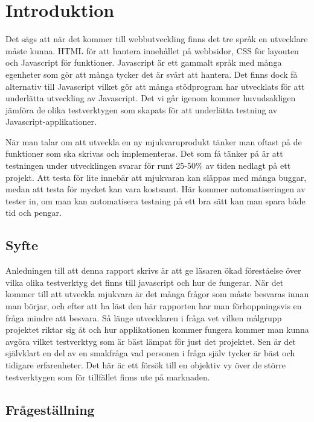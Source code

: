 \section{Introduktion}
\label{sec:david-introduction}
Det sägs att när det kommer till webbutveckling finns det tre språk en utvecklare måste kunna. HTML för att hantera innehållet på webbsidor, CSS för layouten och Javascript för funktioner. Javascript är ett gammalt språk med många egenheter som gör att många tycker det är svårt att hantera. Det finns dock få alternativ till Javascript vilket gör att många stödprogram har utvecklats för att underlätta utveckling av Javascript. Det vi går igenom kommer huvudsakligen jämföra de olika testverktygen som skapats för att underlätta testning av Javascript-applikationer. 


När man talar om att utveckla en ny mjukvaruprodukt tänker man oftast på de funktioner som ska skrivas och implementeras. Det som få tänker på är att testningen under utvecklingen svarar för runt 25-50\% av tiden nedlagt på ett projekt. Att testa för lite innebär att mjukvaran kan släppas med många buggar, medan att testa för mycket kan vara kostsamt. Här kommer automatiseringen av tester in, om man kan automatisera testning på ett bra sätt kan man spara både tid och pengar.

\subsection{Syfte}
Anledningen till att denna rapport skrivs är att ge läsaren ökad föreståelse över vilka olika testverktyg det finns till javascript och hur de fungerar. När det kommer till att utveckla mjukvara är det många frågor som måste besvaras innan man börjar, och efter att ha läst den här rapporten har man förhoppningsvis en fråga mindre att besvara. Så länge utvecklaren i fråga vet vilken målgrupp projektet riktar sig åt och hur applikationen kommer fungera kommer man kunna avgöra vilket testverktyg som är bäst lämpat för just det projektet. Sen är det självklart en del av en smakfråga vad personen i fråga själv tycker är bäst och tidigare erfarenheter. Det här är ett försök till en objektiv vy över de större testverktygen som för tillfället finns ute på marknaden.

\subsection{Frågeställning}
\label{subsec:david-research-questions}

